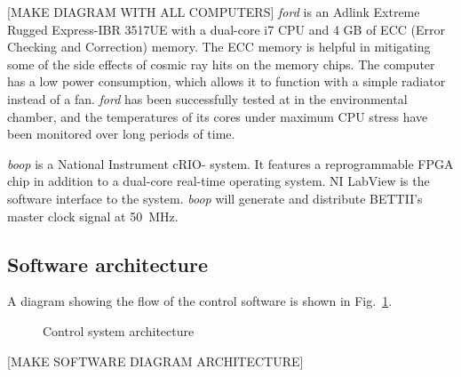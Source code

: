 [MAKE DIAGRAM WITH ALL COMPUTERS]
\textit{ford} is an Adlink Extreme Rugged Express-IBR 3517UE with a dual-core i7 CPU and 4 GB of ECC (Error Checking and Correction) memory. The ECC memory is helpful in mitigating some of the side effects of cosmic ray hits on the memory chips. The computer has a low power consumption, which allows it to function with a simple radiator instead of a fan. 
\textit{ford} has been successfully tested at in the environmental chamber, and the temperatures of its cores under maximum CPU stress have been monitored over long periods of time. 

\textit{boop} is a National Instrument cRIO- system. It features a reprogrammable FPGA chip in addition to a dual-core real-time operating system. NI LabView is the software interface to the system. \textit{boop} will generate and distribute BETTII's master clock signal at \SI{50}{\mega\hertz}.

\subsection{Software architecture}

A diagram showing the flow of the control software is shown in Fig.~\ref{fig:ControlSystem}. 
\begin{figure}[!ht]
	\centering
	
	\caption[Control System Design]{Control system architecture}
	\label{fig:ControlSystem}
    \end{figure}

[MAKE SOFTWARE DIAGRAM ARCHITECTURE]

